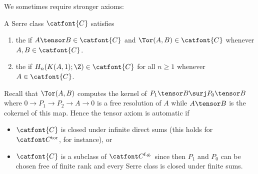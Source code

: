 We sometimes require stronger axioms:
\begin{definition}
	A Serre class $\catfont{C}$ satisfies
	\begin{enumerate}
		\item the  if $A \tensor B \in \catfont{C}$ and $\Tor(A, B) \in \catfont{C}$ whenever $A, B \in \catfont{C}$.
		\item the  if $H_n(K(A, 1); \Z) \in \catfont{C}$ for all $n \geq 1$ whenever $A \in \catfont{C}$.
	\end{enumerate}
\end{definition}
Recall that $\Tor(A, B)$ computes the kernel of $P_1 \tensor B \surj P_0 \tensor B$ where $0 \to P_1 \to P_2 \to A \to 0$ is a free resolution of $A$ while $A \tensor B$ is the cokernel of this map.
Hence the tensor axiom is automatic if
\begin{itemize}
	\item $\catfont{C}$ is closed under infinite direct sums (this holds for $\Ctor$, for instance), or
	\item $\catfont{C}$ is a subclass of $\Cfg$ since then $P_1$ and $P_0$ can be chosen free of finite rank and every Serre class is closed under finite sums.
\end{itemize}

